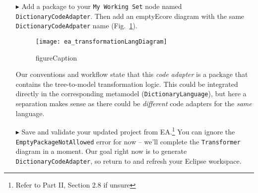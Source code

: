 \begin{enumerate}
\newpage

\item[$\blacktriangleright$] Add a package to your \texttt{My Working Set} node named \texttt{DictionaryCodeAdapter}. Then add an emptyEcore diagram
with the same \texttt{DictionaryCodeAdpater} name (Fig.~\ref{ea:newTransformer}).

\begin{figure}[htpb]
\begin{center}
  \texttt{[image: ea\_transformationLangDiagram]}
  \caption{figureCaption}
  \label{ea:newTransformer}
\end{center}
\end{figure}

Our conventions and workflow state that this \emph{code adapter} is a package that contains the tree-to-model transformation logic. This could be integrated
directly in the corresponding metamodel (\texttt{Dic\-tion\-ary\-Language}), but here a separation makes sense as there could be \emph{different} code adapters
for the \emph{same} language.

\item[$\blacktriangleright$] Save and validate your updated project from EA.\footnote{Refer to Part II, Section 2.8 if unsure} You can ignore the
\texttt{EmptyPackageNotAllowed} error for now -- we'll complete the \texttt{Transformer} diagram in a moment. Our goal right now is to generate
\texttt{DictionaryCodeAdapter}, so return to and refresh your Eclipse workspace. 


\end{enumerate}
